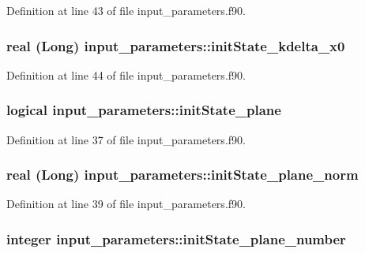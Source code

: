 Definition at line 43 of file input\_\-parameters.f90.

\hypertarget{namespaceinput__parameters_a65eb9165c6a1fd054daefc2a96e7ae2a}{
\subsubsection[{initState\_\-kdelta\_\-x0}]{\setlength{\rightskip}{0pt plus 5cm}real (Long) {\bf input\_\-parameters::initState\_\-kdelta\_\-x0}}}
\label{namespaceinput__parameters_a65eb9165c6a1fd054daefc2a96e7ae2a}


Definition at line 44 of file input\_\-parameters.f90.

\hypertarget{namespaceinput__parameters_a727a13be305b5dde7955fd2d02f955e4}{
\subsubsection[{initState\_\-plane}]{\setlength{\rightskip}{0pt plus 5cm}logical {\bf input\_\-parameters::initState\_\-plane}}}
\label{namespaceinput__parameters_a727a13be305b5dde7955fd2d02f955e4}


Definition at line 37 of file input\_\-parameters.f90.

\hypertarget{namespaceinput__parameters_a22ba3f1343580a0db34433e32279e365}{
\subsubsection[{initState\_\-plane\_\-norm}]{\setlength{\rightskip}{0pt plus 5cm}real (Long) {\bf input\_\-parameters::initState\_\-plane\_\-norm}}}
\label{namespaceinput__parameters_a22ba3f1343580a0db34433e32279e365}


Definition at line 39 of file input\_\-parameters.f90.

\hypertarget{namespaceinput__parameters_a876ac6edc93b733aeb66f54aca167741}{
\subsubsection[{initState\_\-plane\_\-number}]{\setlength{\rightskip}{0pt plus 5cm}integer {\bf input\_\-parameters::initState\_\-plane\_\-number}}}
\label{namespaceinput__parameters_a876ac6edc93b733aeb66f54aca167741}


